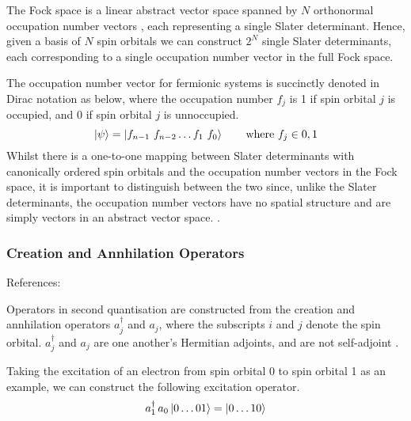 The Fock space is a linear abstract vector space spanned by $N$ orthonormal occupation number vectors \cite{Helgaker2000}, each representing a single Slater determinant. Hence, given a basis of $N$ spin orbitals we can construct $2^N$ single Slater determinants, each corresponding to a single occupation number vector in the full Fock space.

The occupation number vector for fermionic systems is succinctly denoted in Dirac notation as below, where the occupation number $f_j$ is 1 if spin orbital $j$ is occupied, and 0 if spin orbital $j$ is unnoccupied.
\begin{equation*}
    \ket\psi = \ket{f_{n-1} \,\, f_{n-2} \dots f_{1} \,\, f_{0}} \qquad \text{where } f_{j} \in {0, 1}
\end{equation*}
Whilst there is a one-to-one mapping between Slater determinants with canonically ordered spin orbitals and the occupation number vectors in the Fock space, it is important to distinguish between the two since, unlike the Slater determinants, the occupation number vectors have no spatial structure and are simply vectors in an abstract vector space. \cite{Helgaker2000}.


\subsubsection{Creation and Annhilation Operators}
References: \cite{Helgaker2000}

Operators in second quantisation are constructed from the creation and annhilation operators $a_j^\dagger$ and $a_j$, where the subscripts $i$ and $j$ denote the spin orbital. $a_j^\dagger$ and $a_j$ are one another's Hermitian adjoints, and are not self-adjoint \cite{Helgaker2000}.

Taking the excitation of an electron from spin orbital 0 to spin orbital 1 as an example, we can construct the following excitation operator.
\begin{equation*}
    a_1^\dagger \, a_0 \ket{0 \dots 01} = \ket{0 \dots 10}
\end{equation*}

